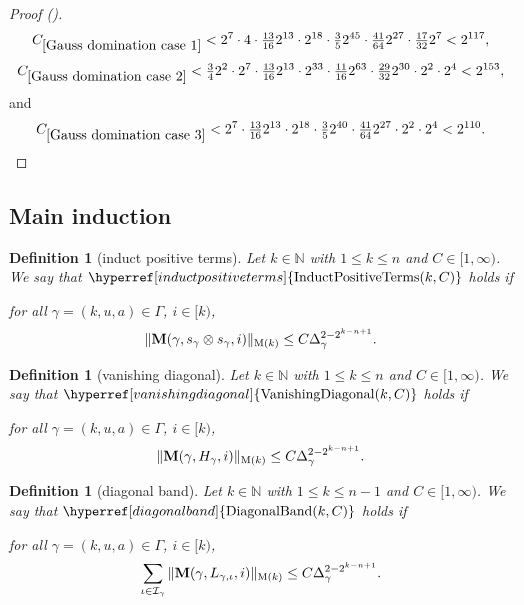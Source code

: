 \documentclass[12pt,reqno]{amsart}
\newcommand{\auto}{{({\tiny\faCar})}}
\theoremstyle{plain}
\newtheorem{definition}[theorem]{Definition}
\numberwithin{equation}{section}
\theoremstyle{remark}
\newcommand{\uses}[1]{}
\newcommand{\usesdefs}[1]{}
\newcommand{\N}{{\mathbb N}}
\newcommand{\M}{\mathbf{M}}
\begin{document}
\begin{proof}[Proof \auto]
\[
C_{\ref{Gauss domination case 1}}
<2^7\cdot4\cdot\tfrac{13}{16}2^{13}\cdot2^{18}
\cdot\tfrac35 2^{45}\cdot\tfrac{41}{64}2^{27}\cdot\tfrac{17}{32}2^7
<2^{117},
\]
\[
C_{\ref{Gauss domination case 2}}
<\tfrac34 2^2\cdot2^7\cdot\tfrac{13}{16}2^{13}\cdot2^{33}
\cdot\tfrac{11}{16}2^{63}\cdot\tfrac{29}{32}2^{30}\cdot2^2\cdot2^4
<2^{153},
\]
and
\[
C_{\ref{Gauss domination case 3}}
<2^7\cdot\tfrac{13}{16}2^{13}\cdot2^{18}
\cdot\tfrac35 2^{40}\cdot\tfrac{41}{64}2^{27}\cdot2^2\cdot2^4
<2^{110}.
\]
\end{proof}

\subsection{Main induction}

\newcommand{\InductPositiveTerms}[1]{{\hyperref[induct positive terms]{{\rm InductPositiveTerms}(#1)}}}
\begin{definition}[induct positive terms]\label{induct positive terms}\uses{}\usesdefs{geometric parameters,kernel sequences,sandwich kernel,s multiplier}
Let $k\in \N$ with $1\le k\le n$ and $C\in [1,\infty)$.
We say that $\InductPositiveTerms{k,C}$ holds if

for all $\gamma=(k,u,a)\in \Gamma$, $i\in [k)$,
\begin{equation}\label{auto:positive-terms-square-root-bound}
    \|\M(\gamma,s_{\gamma} \otimes s_{\gamma},i)\|_{{\rm M}(k)}\le C \Delta_\gamma^{2-2^{k-n+1}}.
\end{equation}
\end{definition}

\newcommand{\VanishingDiagonal}[1]{{\hyperref[vanishing diagonal]{{\rm VanishingDiagonal}(#1)}}}
\begin{definition}[vanishing diagonal]\label{vanishing diagonal}\uses{}\usesdefs{geometric parameters,kernel sequences,sandwich kernel,H multiplier}
Let $k\in \N$ with $1\le k\le n$ and $C\in [1,\infty)$.
We say that $\VanishingDiagonal{k,C}$ holds if

for all $\gamma=(k,u,a)\in \Gamma$, $i\in [k)$,
\begin{equation}\label{auto:H-positive-terms-bound}
    \|\M(\gamma,H_\gamma,i)\|_{{\rm M}(k)}
    \le C \Delta_\gamma^{2-2^{k-n+1}} .
\end{equation}
\end{definition}

\newcommand{\DiagonalBand}[1]{{\hyperref[diagonal band]{{\rm DiagonalBand}(#1)}}}
\begin{definition}[diagonal band]\label{diagonal band}\uses{}\usesdefs{geometric parameters,kernel sequences,sandwich kernel,L multiplier,summation-definition}
Let $k\in \N$ with $1\le k\le n-1$ and $C\in [1,\infty)$.
We say that $\DiagonalBand{k,C}$ holds if

for all $\gamma=(k,u,a)\in \Gamma$, $i\in [k)$,
\begin{equation}\label{auto:L-positive-terms-sum-bound}
   \sum_{\iota\in\mathcal{I}_{\gamma}}
   \|\M(\gamma,L_{\gamma,\iota},i)\|_{{\rm M}(k)}
   \le C\Delta_\gamma^{2-2^{k-n+1}} .
\end{equation}
\end{definition}
\end{document}
